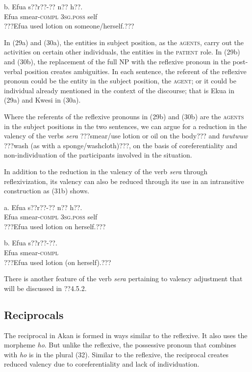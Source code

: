 \documentclass[output=paper]{langsci/langscibook}
\begin{document}
\ea
\gll  b.  Efua  s??r??-??    n??    h??.\\
       Efua  smear-\textsc{compl}  \textsc{3sg.poss}  self\\
\glt   ???Efua used lotion on someone/herself.???
\z

In (29a) and (30a), the entities in subject position, as the \textsc{agents}, carry out the activities on certain other individuals, the entities in the \textsc{patient} role. In (29b) and (30b), the replacement of the full NP with the reflexive pronoun in the post-verbal position creates ambiguities. In each sentence, the referent of the reflexive pronoun could be the entity in the subject position, the \textsc{agent}; or it could be individual already mentioned in the context of the discourse; that is Ekua in (29a) and Kwesi in (30a).

Where the referents of the reflexive pronouns in (29b) and (30b) are the \textsc{agents} in the subject positions in the two sentences, we can argue for a reduction in the valency of the verbs \emph{sera} ???smear/use lotion or oil on the body??? and \emph{twutwuw} ???wash (as with a sponge/washcloth)???, on the basis of coreferentiality and non-individuation of the participants involved in the situation. 

In addition to the reduction in the valency of the verb \emph{sera} through reflexivization, its valency can also be reduced through its use in an intransitive construction as (31b) shows.

\ea
\gll a.  Efua  s??r??-??    n??    h??.\\
       Efua  smear-\textsc{compl}  \textsc{3sg.poss}  self\\
\glt   ???Efua used lotion on herself.???
\z

\ea
\gll b.  Efua  s??r??-??.\\
       Efua  smear-\textsc{compl}\\
\glt   ???Efua used lotion (on herself).???
\z

There is another feature of the verb \emph{sera} pertaining to valency adjustment that will be discussed in ??4.5.2.

\subsection{Reciprocals}

The reciprocal in Akan is formed in ways similar to the reflexive. It also uses the morpheme \emph{ho}. But unlike the reflexive, the possessive pronoun that combines with \emph{ho} is in the plural (32). Similar to the reflexive, the reciprocal creates reduced valency due to coreferentiality and lack of individuation.
\end{document}
